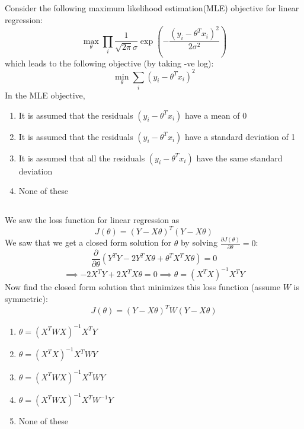 \begin{frame}
\section{}
Consider the following maximum likelihood estimation(MLE) objective for linear regression:
\[\max_\theta \prod_i \frac{1}{\sqrt{2\pi}\sigma} \exp{\left(-\frac{(y_i-\theta^Tx_i)^2}{2\sigma^2}\right)}\]
which leads to the following objective (by taking -ve log):
\[\min_\theta \sum_i (y_i-\theta^Tx_i)^2\]
In the MLE objective,
\begin{enumerate}
\item It is assumed that the residuals $(y_i-\theta^Tx_i)$ have a mean of 0     %
\item It is assumed that the residuals $(y_i-\theta^Tx_i)$ have a standard deviation of 1
\item It is assumed that all the residuals $(y_i-\theta^Tx_i)$ have the same standard deviation     %
\item None of these     %
\end{enumerate}
\end{frame}

\begin{frame}
\section{}
We saw the loss function for linear regression as
\[J(\theta)=(Y-X\theta)^T(Y-X\theta)\]
We saw that we get a closed form solution for $\theta$ by solving $\frac{\partial J(\theta)}{\partial \theta} = 0$:
\[\frac{\partial}{\partial\theta}\left( Y^TY - 2Y^TX\theta + \theta^TX^TX\theta \right) = 0\]
\[\implies-2X^TY+2X^TX\theta=0 \implies\theta=(X^TX)^{-1}X^TY\]
Now find the closed form solution that minimizes this loss function (assume $W$ is symmetric):
\[J(\theta)=(Y-X\theta)^TW(Y-X\theta)\]

\begin{enumerate}
\item $\theta=(X^TWX)^{-1}X^TY$
\item $\theta=(X^TX)^{-1}X^TWY$
\item $\theta=(X^TWX)^{-1}X^TWY$        %
\item $\theta=(X^TWX)^{-1}X^TW^{-1}Y$
\item None of these     %
\end{enumerate}
\end{frame}

